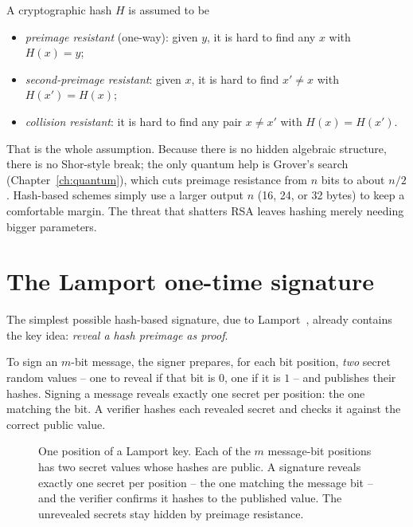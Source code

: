 \begin{definition}
A cryptographic hash $H$ is assumed to be
\begin{itemize}
  \item \emph{preimage resistant} (one-way): given $y$, it is hard to find any $x$ with $H(x)=y$;
  \item \emph{second-preimage resistant}: given $x$, it is hard to find $x'\neq x$ with $H(x')=H(x)$;
  \item \emph{collision resistant}: it is hard to find any pair $x\neq x'$ with $H(x)=H(x')$.
\end{itemize}
\end{definition}

That is the whole assumption. Because there is no hidden algebraic structure, there is no Shor-style break; the only quantum help is Grover's search (Chapter~\ref{ch:quantum}), which cuts preimage resistance from $n$ bits to about $n/2$. Hash-based schemes simply use a larger output $n$ (16, 24, or 32 bytes) to keep a comfortable margin. The threat that shatters RSA leaves hashing merely needing bigger parameters.

\section{The Lamport one-time signature}
The simplest possible hash-based signature, due to Lamport~\cite{lamport1979}, already contains the key idea: \emph{reveal a hash preimage as proof}.

To sign an $m$-bit message, the signer prepares, for each bit position, \emph{two} secret random values -- one to reveal if that bit is $0$, one if it is $1$ -- and publishes their hashes. Signing a message reveals exactly one secret per position: the one matching the bit. A verifier hashes each revealed secret and checks it against the correct public value.

\begin{figure}[H]
\centering
{}
\caption{One position of a Lamport key. Each of the $m$ message-bit positions has two secret values whose hashes are public. A signature reveals exactly one secret per position -- the one matching the message bit -- and the verifier confirms it hashes to the published value. The unrevealed secrets stay hidden by preimage resistance.}
\label{fig:lamport}
\end{figure}

